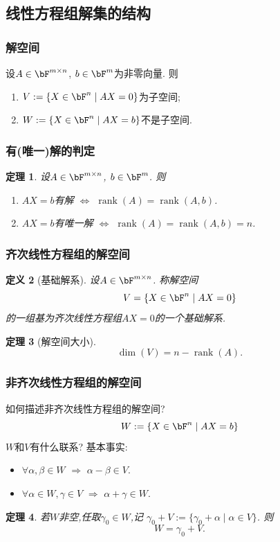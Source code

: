 \documentclass{article}
\DeclareMathOperator{\rank}{rank}
\newtheorem{theorem}{定理}  %
\newtheorem{definition}[theorem]{定义}
\renewcommand{\blue }[1]{{\textcolor[rgb]{0,0,1}{#1}}}
\begin{document}
\subsection{线性方程组解集的结构}

\subsubsection{解空间}
设$A\in \bF^{m\times n}$, $b\in \bF^m$为非零向量. 则 \begin{enumerate}
\item $V:=\{X\in \bF^n\mid AX=0\}$为子空间;
\item $W:=\{X\in \bF^n\mid AX=b\}$不是子空间.
\end{enumerate}

\subsubsection{有(唯一)解的判定}
\begin{theorem}
设$A\in \bF^{m\times n}$, $b\in \bF^m$. 则
\begin{enumerate}
\item $AX=b$有解 $\Leftrightarrow$ $\rank(A)=\rank(A,b)$.
\item $AX=b$有唯一解 $\Leftrightarrow$ $\rank(A)=\rank(A,b)=n$.
\end{enumerate}
\end{theorem}

\subsubsection{齐次线性方程组的解空间}
\begin{definition}[基础解系]
设$A\in \bF^{m\times n}$. 称解空间
\[V=\{X\in \bF^n\mid AX=0\}\]
的一组基为齐次线性方程组$AX=0$的一个\blue{基础解系}.
\end{definition}
\begin{theorem}[解空间大小]
\[\dim(V) = n-\rank(A).\]
\end{theorem}


\subsubsection{非齐次线性方程组的解空间}
如何描述非齐次线性方程组的解空间?
\[W:=\{X\in \bF^n\mid AX=b\}\]
$W$和$V$有什么联系?
基本事实:
\begin{itemize}
\item $\forall \alpha,\beta \in W$ $\Rightarrow$ $\alpha-\beta\in V$.
\item $\forall \alpha\in W,\gamma\in V$ $\Rightarrow$ $\alpha+\gamma\in W$.
\end{itemize}
\begin{theorem}
若$W$非空,任取$\gamma_0\in W$,记 $\gamma_0+V:=\{\gamma_0+\alpha\mid \alpha \in V\}$. 则
\[W=\gamma_0+V.\]
\end{theorem}
\end{document}
